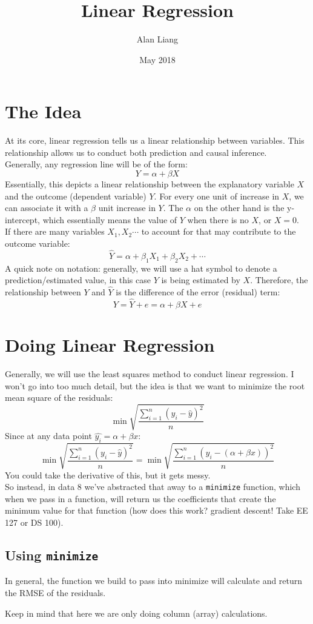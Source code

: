 \documentclass{article}
\title{Linear Regression}
\author{Alan Liang}
\date{May 2018}
\begin{document}
\maketitle
\section{The Idea}
At its core, linear regression tells us a linear relationship between variables.
This relationship allows us to conduct both prediction and causal inference.
\\
Generally, any regression line will be of the form:
$$Y = \alpha + \beta X$$
Essentially, this depicts a linear relationship between the explanatory variable $X$ and the outcome (dependent variable) $Y$. For every one unit of increase in $X$, we can associate it with a $\beta$ unit increase in $Y$.
The $\alpha$ on the other hand is the y-intercept, which essentially means the value of $Y$ when there is no $X$, or $X=0$. 
\\
If there are many variables $X_1,X_2\cdots$ to account for that may contribute to the outcome variable:
$$\hat{Y} = \alpha + \beta_1 X_1 + \beta_2 X_2 + \cdots$$
A quick note on notation: generally, we will use a hat symbol to denote a prediction/estimated value, in this case $Y$ is being estimated by $X$.
Therefore, the relationship between $Y$ and $\hat{Y}$ is the difference of the error (residual) term:
$$Y = \hat{Y} + e = \alpha + \beta X + e$$

\section{Doing Linear Regression}
Generally, we will use the least squares method to conduct linear regression.
I won't go into too much detail, but the idea is that we want to minimize the root mean square of the residuals:
$$\min{\sqrt{\frac{\sum_{i=1}^n (y_i - \hat{y})^2}{n}}}$$
Since at any data point $\hat{y_i} = \alpha + \beta x$:
$$\min{\sqrt{\frac{\sum_{i=1}^n (y_i - \hat{y})^2}{n}}} = \min{\sqrt{\frac{\sum_{i=1}^n (y_i - (\alpha + \beta x))^2}{n}}} $$
You could take the derivative of this, but it gets messy. 
\\
So instead, in data 8 we've abstracted that away to a \texttt{minimize} function, which when we pass in a function, will return us the coefficients that create the minimum value for that function (how does this work? gradient descent! Take EE 127 or DS 100).

\subsection{Using \texttt{minimize}}
In general, the function we build to pass into minimize will calculate and return the RMSE of the residuals.

Keep in mind that here we are only doing column (array) calculations.
\end{document}
